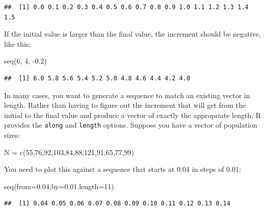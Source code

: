 \documentclass[
]{book}
\newenvironment{Shaded}{\begin{snugshade}}{\end{snugshade}}
\newcommand{\AttributeTok}[1]{\textcolor[rgb]{0.77,0.63,0.00}{#1}}
\newcommand{\DecValTok}[1]{\textcolor[rgb]{0.00,0.00,0.81}{#1}}
\newcommand{\FloatTok}[1]{\textcolor[rgb]{0.00,0.00,0.81}{#1}}
\newcommand{\FunctionTok}[1]{\textcolor[rgb]{0.00,0.00,0.00}{#1}}
\newcommand{\NormalTok}[1]{#1}
\newcommand{\OtherTok}[1]{\textcolor[rgb]{0.56,0.35,0.01}{#1}}
\newcommand{\SpecialCharTok}[1]{\textcolor[rgb]{0.00,0.00,0.00}{#1}}
\begin{document}
\begin{verbatim}
##  [1] 0.0 0.1 0.2 0.3 0.4 0.5 0.6 0.7 0.8 0.9 1.0 1.1 1.2 1.3 1.4 1.5
\end{verbatim}

If the initial value is larger than the final value, the increment should be negative, like this:

\begin{Shaded}
\begin{Highlighting}[]
\FunctionTok{seq}\NormalTok{(}\DecValTok{6}\NormalTok{, }\DecValTok{4}\NormalTok{, }\SpecialCharTok{{-}}\FloatTok{0.2}\NormalTok{)}
\end{Highlighting}
\end{Shaded}

\begin{verbatim}
##  [1] 6.0 5.8 5.6 5.4 5.2 5.0 4.8 4.6 4.4 4.2 4.0
\end{verbatim}

In many cases, you want to generate a sequence to match an existing vector in length. Rather than having to figure out the increment that will get from the initial to the final value and produce a vector of exactly the appropriate length, R provides the \texttt{along} and \texttt{length} options. Suppose you have a vector of population sizes:

\begin{Shaded}
\begin{Highlighting}[]
\NormalTok{N }\OtherTok{=} \FunctionTok{c}\NormalTok{(}\DecValTok{55}\NormalTok{,}\DecValTok{76}\NormalTok{,}\DecValTok{92}\NormalTok{,}\DecValTok{103}\NormalTok{,}\DecValTok{84}\NormalTok{,}\DecValTok{88}\NormalTok{,}\DecValTok{121}\NormalTok{,}\DecValTok{91}\NormalTok{,}\DecValTok{65}\NormalTok{,}\DecValTok{77}\NormalTok{,}\DecValTok{99}\NormalTok{)}
\end{Highlighting}
\end{Shaded}

You need to plot this against a sequence that starts at 0.04 in steps of 0.01:

\begin{Shaded}
\begin{Highlighting}[]
\FunctionTok{seq}\NormalTok{(}\AttributeTok{from=}\FloatTok{0.04}\NormalTok{,}\AttributeTok{by=}\FloatTok{0.01}\NormalTok{,}\AttributeTok{length=}\DecValTok{11}\NormalTok{)}
\end{Highlighting}
\end{Shaded}

\begin{verbatim}
##  [1] 0.04 0.05 0.06 0.07 0.08 0.09 0.10 0.11 0.12 0.13 0.14
\end{verbatim}
\end{document}
